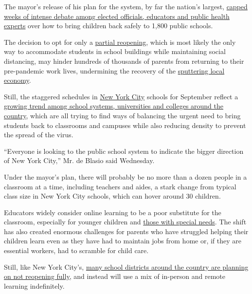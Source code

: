 The mayor's release of his plan for the system, by far the nation's
largest,
\href{https://www.nytimes.com/2020/07/06/nyregion/nyc-school-reopening-plan.html}{capped
weeks of intense debate among elected officials, educators and public
health experts} over how to bring children back safely to 1,800 public
schools.

The decision to opt for only a
\href{https://www.nytimes.com/2020/07/17/nyregion/phase-4-nyc-reopen.html}{partial
reopening}, which is most likely the only way to accommodate students in
school buildings while maintaining social distancing, may hinder
hundreds of thousands of parents from returning to their pre-pandemic
work lives, undermining the recovery of the
\href{https://www.nytimes.com/2020/07/07/nyregion/nyc-unemployment.html}{sputtering
local economy}.

Still, the staggered schedules in
\href{https://www.nytimes.com/article/new-york-phase-reopening.html}{New
York City} schools for September reflect a
\href{https://www.nytimes.com/2020/06/26/us/coronavirus-schools-reopen-fall.html}{growing
trend among school systems, universities and colleges around the
country}, which are all trying to find ways of balancing the urgent need
to bring students back to classrooms and campuses while also reducing
density to prevent the spread of the virus.

``Everyone is looking to the public school system to indicate the bigger
direction of New York City,'' Mr. de Blasio said Wednesday.

Under the mayor's plan, there will probably be no more than a dozen
people in a classroom at a time, including teachers and aides, a stark
change from typical class size in New York City schools, which can hover
around 30 children.

Educators widely consider online learning to be a poor substitute for
the classroom, especially for younger children and
\href{https://www.nytimes.com/2020/04/16/nyregion/special-education-coronavirus-nyc.html}{those
with special needs}. The shift has also created enormous challenges for
parents who have struggled helping their children learn even as they
have had to maintain jobs from home or, if they are essential workers,
had to scramble for child care.

Still, like New York City's,
\href{https://www.nytimes.com/2020/06/26/us/coronavirus-schools-reopen-fall.html}{many
school districts around the country are planning on not reopening
fully}, and instead will use a mix of in-person and remote learning
indefinitely.


